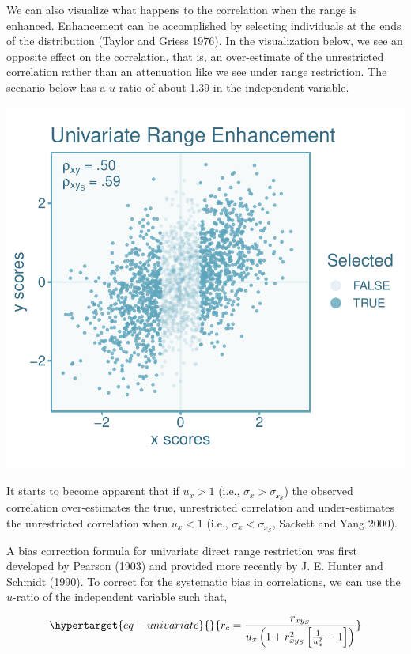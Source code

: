 \documentclass[
  letterpaper,
  DIV=11,
  numbers=noendperiod]{scrreprt}
\begin{document}
We can also visualize what happens to the correlation when the range is
enhanced. Enhancement can be accomplished by selecting individuals at
the ends of the distribution (Taylor and Griess 1976). In the
visualization below, we see an opposite effect on the correlation, that
is, an over-estimate of the unrestricted correlation rather than an
attenuation like we see under range restriction. The scenario below has
a \(u\)-ratio of about 1.39 in the independent variable.

\includegraphics{direct_range_restriction_files/figure-pdf/unnamed-chunk-3-1.pdf}

It starts to become apparent that if \(u_x>1\) (i.e.,
\(\sigma_x>\sigma_\mathcal{x_S}\)) the observed correlation
over-estimates the true, unrestricted correlation and under-estimates
the unrestricted correlation when \(u_x<1\) (i.e.,
\(\sigma_x<\sigma_\mathcal{x_S}\), Sackett and Yang 2000).

A bias correction formula for univariate direct range restriction was
first developed by Pearson (1903) and provided more recently by J. E.
Hunter and Schmidt (1990). To correct for the systematic bias in
correlations, we can use the \(u\)-ratio of the independent variable
such that,

\begin{equation}\protect\hypertarget{eq-univariate}{}{
r_c = \frac{r_{xy_S}}{u_x\left(1+r_{xy_S}^2\left[\frac{1}{u^2_x}-1\right]\right)}
}\label{eq-univariate}\end{equation}
\end{document}
